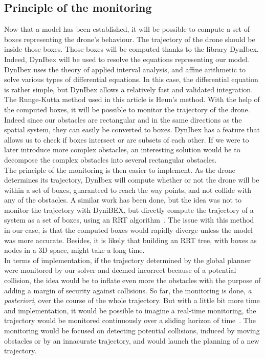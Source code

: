 \documentclass[letterpaper, 10 pt, conference]{ieeeconf}  %
\begin{document}
\subsection{Principle of the monitoring}
Now that a model has been established, it will be possible to compute a set of boxes representing the drone's behaviour. The trajectory of the drone should be inside those boxes. Those boxes will be computed thanks to the library DynIbex. Indeed, DynIbex will be used to resolve the equations representing our model. DynIbex uses the theory of applied interval analysis, and affine arithmetic to solve various types of differential equations. In this case, the differential equation is rather simple, but DynIbex allows a relatively fast and validated integration. The Runge-Kutta method used in this article is Heun's method. With the help of the computed boxes, it will be possible to monitor the trajectory of the drone. Indeed since our obstacles are rectangular and in the same directions as the spatial system, they can easily be converted to boxes. DynIbex has a feature that allows us to check if boxes intersect or are subsets of each other. If we were to later introduce more complex obstacles, an interesting solution would be to decompose the complex obstacles into several rectangular obstacles.\\

The principle of the monitoring is then easier to implement. As the drone determines its trajectory, DynIbex will compute whether or not the drone will be within a set of boxes, guaranteed to reach the way points, and not collide with any of the obstacles. A similar work has been done, but the idea was not to monitor the trajectory with DyniBEX, but directly compute the trajectory of a system as a set of boxes, using an RRT algorithm~\cite{box_RRT}. The issue with this method in our case, is that the computed boxes would rapidly diverge unless the model was more accurate. Besides, it is likely that building an RRT tree, with boxes as nodes in a 3D space, might take a long time.\\

In terms of implementation, if the trajectory determined by the global planner were monitored by our solver and deemed incorrect because of a potential collision, the idea would be to inflate even more the obstacles with the purpose of adding a margin of security against collisions. So far, the monitoring is done, \emph{a posteriori}, over the course of the whole trajectory. But with a little bit more time and implementation, it would be possible to imagine a real-time monitoring, the trajectory would be monitored continuously over a sliding horizon of time~\cite{Sliding}. The monitoring would be focused on detecting potential collisions, induced by moving obstacles or by an innacurate trajectory, and would launch the planning of a new trajectory.
\end{document}
